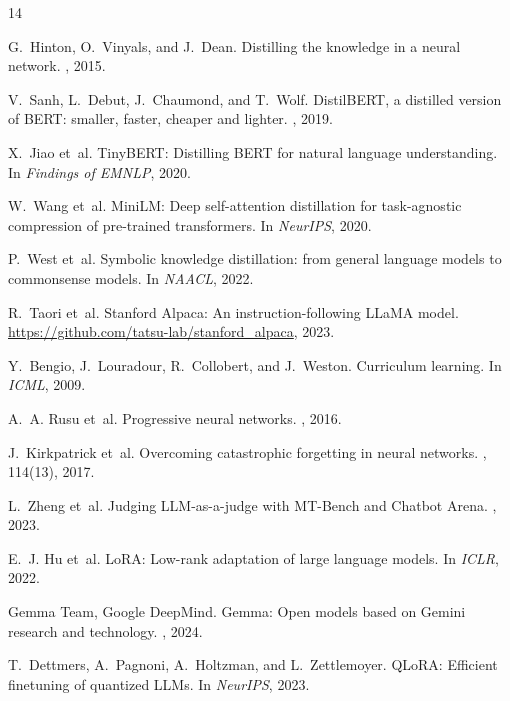 \documentclass[sigconf]{acmart}
\begin{document}

\begin{thebibliography}{14}

G.~Hinton, O.~Vinyals, and J.~Dean.
\newblock Distilling the knowledge in a neural network.
, 2015.

V.~Sanh, L.~Debut, J.~Chaumond, and T.~Wolf.
\newblock DistilBERT, a distilled version of BERT: smaller, faster, cheaper and lighter.
, 2019.

X.~Jiao et~al.
\newblock TinyBERT: Distilling BERT for natural language understanding.
\newblock In {\em Findings of EMNLP}, 2020.

W.~Wang et~al.
\newblock MiniLM: Deep self-attention distillation for task-agnostic compression of pre-trained transformers.
\newblock In {\em NeurIPS}, 2020.

P.~West et~al.
\newblock Symbolic knowledge distillation: from general language models to commonsense models.
\newblock In {\em NAACL}, 2022.

R.~Taori et~al.
\newblock Stanford Alpaca: An instruction-following LLaMA model.
\newblock \url{https://github.com/tatsu-lab/stanford_alpaca}, 2023.

Y.~Bengio, J.~Louradour, R.~Collobert, and J.~Weston.
\newblock Curriculum learning.
\newblock In {\em ICML}, 2009.

A.~A. Rusu et~al.
\newblock Progressive neural networks.
, 2016.

J.~Kirkpatrick et~al.
\newblock Overcoming catastrophic forgetting in neural networks.
, 114(13), 2017.

L.~Zheng et~al.
\newblock Judging LLM-as-a-judge with MT-Bench and Chatbot Arena.
, 2023.

E.~J. Hu et~al.
\newblock LoRA: Low-rank adaptation of large language models.
\newblock In {\em ICLR}, 2022.

Gemma Team, Google DeepMind.
\newblock Gemma: Open models based on Gemini research and technology.
, 2024.

T.~Dettmers, A.~Pagnoni, A.~Holtzman, and L.~Zettlemoyer.
\newblock QLoRA: Efficient finetuning of quantized LLMs.
\newblock In {\em NeurIPS}, 2023.

\end{thebibliography}
\end{document}
